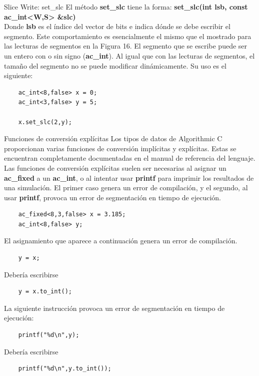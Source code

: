 \documentclass[11pt]{beamer}
\begin{document}
	\begin{frame}[fragile]{Slice Write: set\_slc}
	\justifying \footnotesize
	El método \textbf{set\_slc} tiene la forma: \textbf{set\_slc(int lsb, const ac\_int<W,S> \&slc)}\newline
	\\Donde \textbf{lsb} es el índice del vector de bits e indica dónde se debe escribir el segmento. Este comportamiento es esencialmente el mismo que el mostrado para las lecturas de segmentos en la Figura 16. El segmento que se escribe puede ser un entero con o sin signo (\textbf{ac\_int}). Al igual que con las lecturas de segmentos, el tamaño del segmento no se puede modificar dinámicamente. Su uso es el siguiente:\newline
	\begin{lstlisting}
	ac_int<8,false> x = 0;
	ac_int<3,false> y = 5;
	
	x.set_slc(2,y);	
	\end{lstlisting}
	\end{frame}
	
	\begin{frame}[fragile]{Funciones de conversión explícitas}
	\justifying \footnotesize
	Los tipos de datos de Algorithmic C proporcionan varias funciones de conversión implícitas y explícitas. Estas se encuentran completamente documentadas en el manual de referencia del lenguaje. Las funciones de conversión explícitas suelen ser necesarias al asignar un \textbf{ac\_fixed} a un \textbf{ac\_int}, o al intentar usar \textbf{printf} para imprimir los resultados de una simulación. El primer caso genera un error de compilación, y el segundo, al usar  \textbf{printf}, provoca un error de segmentación en tiempo de ejecución.
	\begin{lstlisting}
	ac_fixed<8,3,false> x = 3.185;
	ac_int<8,false> y;
	\end{lstlisting}
	
	El asignamiento que aparece a continuación genera un error de compilación.
	\begin{lstlisting}
	y = x;
	\end{lstlisting}
	
	Debería escribirse
	\begin{lstlisting}
	y = x.to_int();
	\end{lstlisting}
	
	La siguiente instrucción provoca un error de segmentación en tiempo de ejecución:
	\begin{lstlisting}
	printf("%d\n",y);
	\end{lstlisting}
	Debería escribirse
	\begin{lstlisting}
	printf("%d\n",y.to_int());
	\end{lstlisting}
	
	\end{frame}
\end{document}
